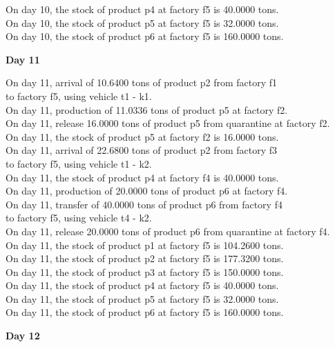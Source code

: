 \begin{table}[H]
\begin{multicols}{2}
\begin{tabbing}
On day 10, the stock of product p4 at factory f5 is 40.0000 tons. \\
On day 10, the stock of product p5 at factory f5 is 32.0000 tons. \\
On day 10, the stock of product p6 at factory f5 is 160.0000 tons. \\
\end{tabbing} \vspace{-2.0em}
\textbf{Day 11}
\vspace{-1.6em}
\begin{tabbing}
On day 11, arrival of 10.6400 tons of product p2 from factory f1 \\ to factory f5, using vehicle t1 - k1. \\
On day 11, production of 11.0336 tons of product p5 at factory f2. \\
On day 11, release 16.0000 tons of product p5 from quarantine at factory f2. \\
On day 11, the stock of product p5 at factory f2 is 16.0000 tons. \\
On day 11, arrival of 22.6800 tons of product p2 from factory f3 \\ to factory f5, using vehicle t1 - k2. \\
On day 11, the stock of product p4 at factory f4 is 40.0000 tons. \\
On day 11, production of 20.0000 tons of product p6 at factory f4. \\
On day 11, transfer of 40.0000 tons of product p6 from factory f4 \\ to factory f5, using vehicle t4 - k2. \\
On day 11, release 20.0000 tons of product p6 from quarantine at factory f4. \\
On day 11, the stock of product p1 at factory f5 is 104.2600 tons. \\
On day 11, the stock of product p2 at factory f5 is 177.3200 tons. \\
On day 11, the stock of product p3 at factory f5 is 150.0000 tons. \\
On day 11, the stock of product p4 at factory f5 is 40.0000 tons. \\
On day 11, the stock of product p5 at factory f5 is 32.0000 tons. \\
On day 11, the stock of product p6 at factory f5 is 160.0000 tons. \\
\end{tabbing} \vspace{-2.0em}
\textbf{Day 12}
\vspace{-1.6em}

\end{multicols}
\end{table}
